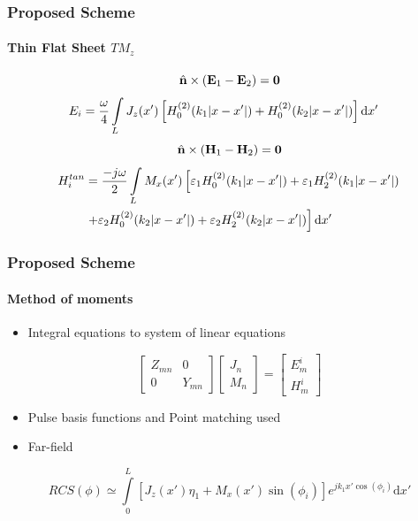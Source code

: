 \documentclass[mathserif,18pt,xcolor=table]{beamer}
\begin{document}
\begin{frame}
\frametitle{Proposed Scheme}
\framesubtitle{Thin Flat Sheet $TM_z$}
\begin{equation} \nonumber
  \hat{\mathbf{n}} \times (\mathbf{E}_1 - \mathbf{E}_2) = \mathbf{0}
  \label{eq:E1bc}
\end{equation}
\begin{align} \nonumber
  E_i ={}& \frac{\omega}{4} \int\limits_L J_z(x') \left[ H_0^{(2)}(k_1 | x -  x'|) + H_0^{(2)}(k_2 |x - x'|)\right] \mathop{}\!\mathrm{d}{x'}  \notag
  \label{eq:scalarE}
\end{align}
\begin{equation} \nonumber
  \hat{\mathbf{n}} \times (\mathbf{H}_1 - \mathbf{H}_2) = \mathbf{0}
  \label{eq:E1bc}
\end{equation}
\begin{align} \nonumber
  H_i^{tan} &= \frac{-j \omega}{2} \int\limits_L M_x(x') \left[ \varepsilon_1 H_0^{(2)}(k_1 |x - x'|) + \varepsilon_1 H_2^{(2)}(k_1 |x - x'|) \right. \notag\\
  & \left. + \varepsilon_2 H_0^{(2)}(k_2 |x - x'|) + \varepsilon_2 H_2^{(2)}(k_2 |x - x'|)\right] \mathop{}\!\mathrm{d}{x'} \notag
  \label{eq:scalarH}
\end{align}
\end{frame}
\begin{frame}
  \frametitle{Proposed Scheme}
  \framesubtitle{Method of moments}
  \begin{itemize}
    \item {Integral equations to system of linear equations}
  \end{itemize}
  \[
  \begin{bmatrix}
    Z_{mn}   & 0 \\
    0        & Y_{mn}
  \end{bmatrix}
  \begin{bmatrix}
    J_n \\
    M_n
  \end{bmatrix}
  =
  \begin{bmatrix}
    E_m^i \\
    H_m^i
  \end{bmatrix}
  \]
  \begin{itemize}
    \item {Pulse basis functions and Point matching used}
    \item {Far-field}
  \end{itemize}
  \begin{equation} \nonumber
  RCS({\phi}) \simeq \int \limits_{0}^{L} \left[J_z(x')\eta_1 + M_x(x')\sin(\phi_i)\right] e^{j k_1 x' \cos(\phi_i)} \mathrm{d}x'
  \label{eq:far-field}
\end{equation}
\end{frame}
\end{document}
